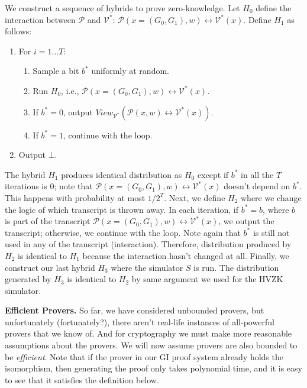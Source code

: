 We construct a sequence of hybrids to prove zero-knowledge. Let $H_0$ define the interaction between $\mathcal{P}$ and $\mathcal{V^*}$: $\mathcal{P}(x=(G_0, G_1), w)\leftrightarrow \mathcal{V^*}(x)$. Define $H_1$ as follows: 
\begin{enumerate}
	\item For $i = 1\dots T$:
\begin{enumerate}
	\item Sample a bit $b^*$ uniformly at random.

	\item Run $H_0$, i.e., $\mathcal{P}(x=(G_0, G_1), w)\leftrightarrow \mathcal{V^*}(x)$.
	
	\item If $b^*=0$, output $View_{\mathcal{V^*}}(\mathcal{P}(x,w) \leftrightarrow \mathcal{V^*}(x))$.
	
	\item If $b^*=1$, continue with the loop.
\end{enumerate}
\item Output $\bot$.
\end{enumerate}

The hybrid $H_1$ produces identical distribution as $H_0$ except if $b^*$ in all the $T$ iterations is $0$; note that $\mathcal{P}(x=(G_0, G_1), w)\leftrightarrow \mathcal{V^*}(x)$ doesn't depend on $b^*$. This happens with probability at most $1/2^T$. Next, we define $H_2$ where we change the logic of which transcript is thrown away. In each iteration, if $b^* = b$, where $b$ is part of the transcript $\mathcal{P}(x=(G_0, G_1), w)\leftrightarrow \mathcal{V^*}(x)$, we output the transcript; otherwise, we continue with the loop. Note again that $b^*$ is still not used in any of the transcript (interaction). Therefore, distribution produced by $H_2$ is identical to $H_1$ because the interaction hasn't changed at all. Finally, we construct our last hybrid $H_3$ where the simulator $S$ is run. The distribution generated by $H_3$ is identical to $H_2$ by same argument we used for the HVZK simulator. \bigskip


\noindent\textbf{Efficient Provers.} So far, we have considered unbounded provers, but unfortunately (fortunately?), there aren't real-life instances of all-powerful provers that we know of. And for cryptography we must make more reasonable assumptions about the provers.  We will now assume provers are also bounded to be \emph{efficient}. Note that if the prover in our GI proof system already holds the isomorphism, then generating the proof only takes polynomial time, and it is easy to see that it satisfies the definition below. \smallskip

